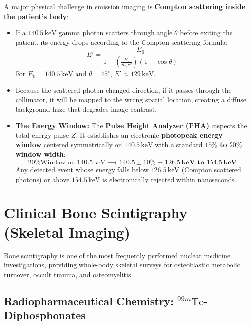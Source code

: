 \documentclass[11pt,a4paper]{article}
\begin{document}
A major physical challenge in emission imaging is \textbf{Compton scattering inside the patient's body}:
\begin{itemize}[leftmargin=*]
    \item If a $140.5\,\text{keV}$ gamma photon scatters through angle $\theta$ before exiting the patient, its energy drops according to the Compton scattering formula:
    \begin{equation}
        E' = \frac{E_0}{1 + \left( \frac{E_0}{m_e c^2} \right) (1 - \cos\theta)}
    \end{equation}
    For $E_0 = 140.5\,\text{keV}$ and $\theta = 45^\circ$, $E' \approx 129\,\text{keV}$.
    \item Because the scattered photon changed direction, if it passes through the collimator, it will be mapped to the wrong spatial location, creating a diffuse background haze that degrades image contrast.
    \item \textbf{The Energy Window:} The \textbf{Pulse Height Analyzer (PHA)} inspects the total energy pulse $Z$. It establishes an electronic \textbf{photopeak energy window} centered symmetrically on $140.5\,\text{keV}$ with a standard \textbf{$15\%$ to $20\%$ window width}:
    \begin{equation}
        \text{20\% Window on } 140.5\,\text{keV} \implies 140.5 \pm 10\% = \mathbf{126.5\,\text{keV to } 154.5\,\text{keV}}
    \end{equation}
    Any detected event whose energy falls below $126.5\,\text{keV}$ (Compton scattered photons) or above $154.5\,\text{keV}$ is electronically rejected within nanoseconds.
\end{itemize}

\newpage
\section{Clinical Bone Scintigraphy (Skeletal Imaging)}

Bone scintigraphy is one of the most frequently performed nuclear medicine investigations, providing whole-body skeletal surveys for osteoblastic metabolic turnover, occult trauma, and osteomyelitis.

\subsection{Radiopharmaceutical Chemistry: \texorpdfstring{$^{99m}\text{Tc}$}{99mTc}-Diphosphonates}
\end{document}
